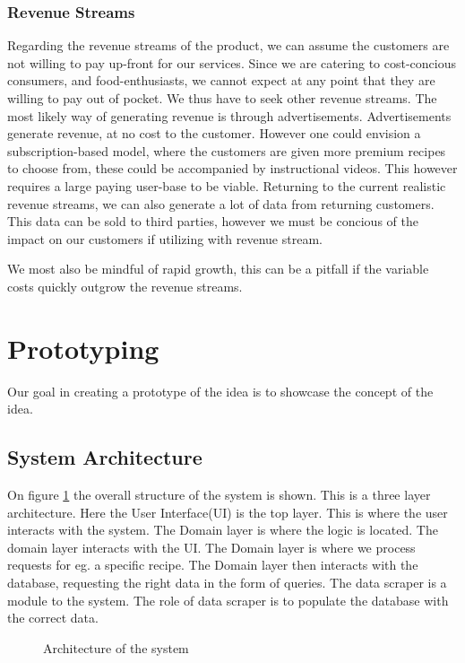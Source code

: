 \documentclass{article}
\begin{document}
\subsubsection{Revenue Streams}
Regarding the revenue streams of the product, we can assume the customers are not willing
to pay up-front for our services. Since we are catering to cost-concious consumers, and
food-enthusiasts, we cannot expect at any point that they are willing to pay out of
pocket. We thus have to seek other revenue streams. The most likely way of generating
revenue is through advertisements. Advertisements generate revenue, at no cost to the
customer. 
However one could envision a subscription-based model, where the customers are given more
premium recipes to choose from, these could be accompanied by instructional videos. This
however requires a large paying user-base to be viable.
Returning to the current realistic revenue streams, we can also generate a lot of data
from returning customers. This data can be sold to third parties, however we must be
concious of the impact on our customers if utilizing with revenue stream.

We most also be mindful of rapid growth, this can be a pitfall if the variable costs
quickly outgrow the revenue streams.


\section{Prototyping}
Our goal in creating a prototype of the idea is to showcase the concept of the idea.

\subsection{System Architecture}

On figure \ref{fig:layerstructure} the overall structure of the system is shown. This is a
three layer architecture. Here the User Interface(UI) is the top layer. This is where the
user interacts with the system. The Domain layer is where the logic is located. The domain
layer interacts with the UI. The Domain layer is where we process requests for eg. a
specific recipe. The Domain layer then interacts with the database, requesting the right
data in the form of queries. The data scraper is a module to the system. The role of data
scraper is to populate the database with the correct data.

\begin{figure}[H]
  \centering
  \caption{Architecture of the system}
  \label{fig:layerstructure}
\end{figure}
\end{document}
